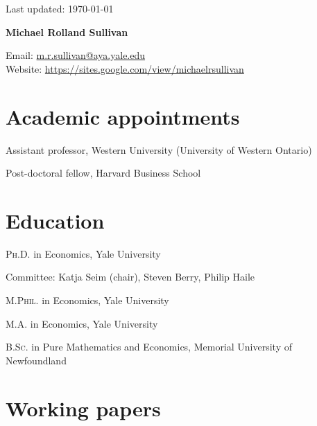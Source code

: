 \documentclass[11pt]{article} %
\begin{document}
 \begin{flushright}
   \scriptsize
	Last updated: \today
   \normalsize
\end{flushright}
{\LARGE\bfseries Michael Rolland Sullivan} %
\bigskip\bigskip\medskip %

\medskip %

Email: \href{mailto:m.r.sullivan@yale.edu}{m.r.sullivan@aya.yale.edu}\\ 
Website: \href{https://sites.google.com/view/michaelrsullivan/home}{https://sites.google.com/view/michaelrsullivan}\\ 

%

\section*{Academic appointments}

 Assistant professor, Western University (University of Western Ontario) 

 Post-doctoral fellow, Harvard Business School


\section*{Education}

\textsc{Ph.D.} in Economics, Yale University  

\hspace{1cm} \small Committee: Katja Seim (chair), Steven Berry, Philip Haile\normalsize

\textsc{M.Phil.} in Economics, Yale University 

\textsc{M.A.} in Economics, Yale University 

\textsc{B.Sc.} in Pure Mathematics and Economics, Memorial University of Newfoundland

\section*{Working papers}
\end{document}
